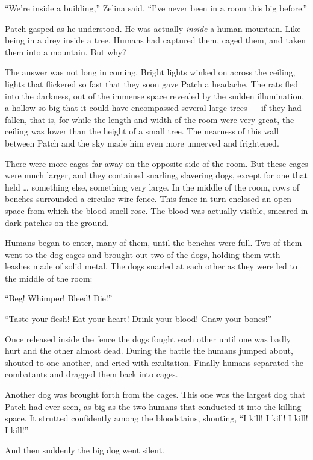 \documentclass[ebook,oneside,openany,12pt]{memoir}
\begin{document}
“We’re inside a building,” Zelina said. “I’ve never been in a room
this big before.”

Patch gasped as he understood. He was actually \emph{inside} a human
mountain. Like being in a drey inside a tree. Humans had captured
them, caged them, and taken them into a mountain. But why?

The answer was not long in coming. Bright lights winked on across the
ceiling, lights that flickered so fast that they soon gave Patch a
headache. The rats fled into the darkness, out of the immense space
revealed by the sudden illumination, a hollow so big that it could
have encompassed several large trees — if they had fallen, that is,
for while the length and width of the room were very great, the
ceiling was lower than the height of a small tree. The nearness of
this wall between Patch and the sky made him even more unnerved and
frightened.

There were more cages far away on the opposite side of the room. But
these cages were much larger, and they contained snarling, slavering
dogs, except for one that held … something else, something very
large. In the middle of the room, rows of benches surrounded a
circular wire fence. This fence in turn enclosed an open space from
which the blood-smell rose. The blood was actually visible, smeared in
dark patches on the ground.

Humans began to enter, many of them, until the benches were full. Two
of them went to the dog-cages and brought out two of the dogs, holding
them with leashes made of solid metal. The dogs snarled at each other
as they were led to the middle of the room:

“Beg! Whimper! Bleed! Die!”

“Taste your flesh! Eat your heart! Drink your blood! Gnaw your bones!”

Once released inside the fence the dogs fought each other until one
was badly hurt and the other almost dead. During the battle the humans
jumped about, shouted to one another, and cried with
exultation. Finally humans separated the combatants and dragged them
back into cages.

Another dog was brought forth from the cages. This one was the largest
dog that Patch had ever seen, as big as the two humans that conducted
it into the killing space. It strutted confidently among the
bloodstains, shouting, “I kill! I kill! I kill! I kill!”

And then suddenly the big dog went silent.
\end{document}
